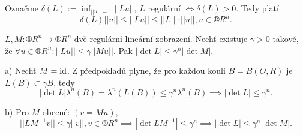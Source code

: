 \documentclass[12pt]{article}					%
\begin{document}
\begin{poznamka}
	Označme $\delta(L) := \inf_{||u|| = 1} ||L u||$, $L$ regulární $\Leftrightarrow \delta(L) > 0$. Tedy platí
	$$ \delta(L) ||u|| ≤ ||L u|| ≤ ||L||·||u||, u \in ®R^n. $$
\end{poznamka}

\begin{tvrzeni}
	$L, M: ®R^n \rightarrow ®R^n$ dvě regulární lineární zobrazení. Nechť existuje $\gamma > 0$ takové, že $\forall u \in ®R^n: ||Lu|| ≤ \gamma ||Mu||$. Pak $|\det L| ≤ \gamma^n |\det M|$.

	\begin{dukazin}
		a) Nechť $M = \operatorname{id}$. Z předpokladů plyne, že pro každou kouli $B = B(O, R)$ je $L(B) \subset \gamma B$, tedy
		$$ |\det L|\lambda^n(B) = \lambda^n(L(B)) ≤ \gamma^n \lambda^n(B) \implies |\det L| ≤ \gamma^n. $$

		b) Pro $M$ obecné: $(v = Mu)$,
		$$ ||LM^{-1} v|| ≤ \gamma ||v||, v \in ®R^n \implies |\det LM^{-1}| ≤ \gamma^n \implies |\det L| ≤ \gamma^n|\det M|. $$
	\end{dukazin}
\end{tvrzeni}

\end{document}
